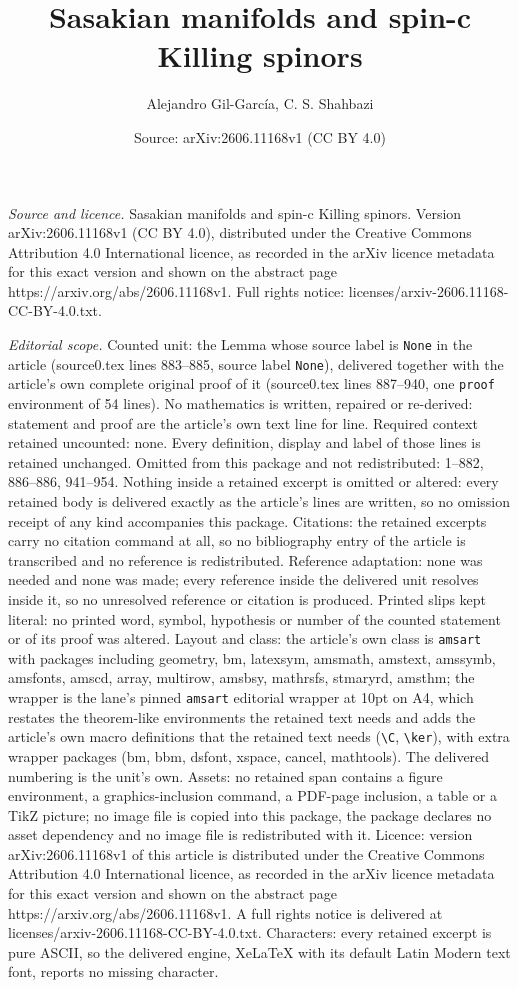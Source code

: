 \documentclass[10pt,a4paper]{amsart}
\title[Sasakian manifolds and spin-c Killing spinors]{Sasakian manifolds and spin-c Killing spinors}
\author{Alejandro Gil-Garc\'ia, C. S. Shahbazi}
\date{Source: arXiv:2606.11168v1 (CC BY 4.0)}
\begin{document}
\maketitle

\noindent\emph{Source and licence.} Sasakian manifolds and spin-c Killing spinors. Version arXiv:2606.11168v1 (CC BY 4.0), distributed under the Creative Commons Attribution 4.0 International licence, as recorded in the arXiv licence metadata for this exact version and shown on the abstract page https://arxiv.org/abs/2606.11168v1. Full rights notice: licenses/arxiv-2606.11168-CC-BY-4.0.txt.\par\smallskip

\noindent\textit{Editorial scope.} Counted unit: the Lemma whose source label is \texttt{None} in the article (source0.tex lines 883--885, source label \texttt{None}), delivered together with the article's own complete original proof of it (source0.tex lines 887--940, one \texttt{proof} environment of 54 lines). No mathematics is written, repaired or re-derived: statement and proof are the article's own text line for line. Required context retained uncounted: none. Every definition, display and label of those lines is retained unchanged. Omitted from this package and not redistributed: 1--882, 886--886, 941--954. Nothing inside a retained excerpt is omitted or altered: every retained body is delivered exactly as the article's lines are written, so no omission receipt of any kind accompanies this package. Citations: the retained excerpts carry no citation command at all, so no bibliography entry of the article is transcribed and no reference is redistributed. Reference adaptation: none was needed and none was made; every reference inside the delivered unit resolves inside it, so no unresolved reference or citation is produced. Printed slips kept literal: no printed word, symbol, hypothesis or number of the counted statement or of its proof was altered. Layout and class: the article's own class is \texttt{amsart} with packages including geometry, bm, latexsym, amsmath, amstext, amssymb, amsfonts, amscd, array, multirow, amsbsy, mathrsfs, stmaryrd, amsthm; the wrapper is the lane's pinned \texttt{amsart} editorial wrapper at 10pt on A4, which restates the theorem-like environments the retained text needs and adds the article's own macro definitions that the retained text needs (\texttt{\textbackslash C}, \texttt{\textbackslash ker}), with extra wrapper packages (bm, bbm, dsfont, xspace, cancel, mathtools). The delivered numbering is the unit's own. Assets: no retained span contains a figure environment, a graphics-inclusion command, a PDF-page inclusion, a table or a TikZ picture; no image file is copied into this package, the package declares no asset dependency and no image file is redistributed with it. Licence: version arXiv:2606.11168v1 of this article is distributed under the Creative Commons Attribution 4.0 International licence, as recorded in the arXiv licence metadata for this exact version and shown on the abstract page https://arxiv.org/abs/2606.11168v1. A full rights notice is delivered at licenses/arxiv-2606.11168-CC-BY-4.0.txt. Characters: every retained excerpt is pure ASCII, so the delivered engine, XeLaTeX with its default Latin Modern text font, reports no missing character.
\end{document}
